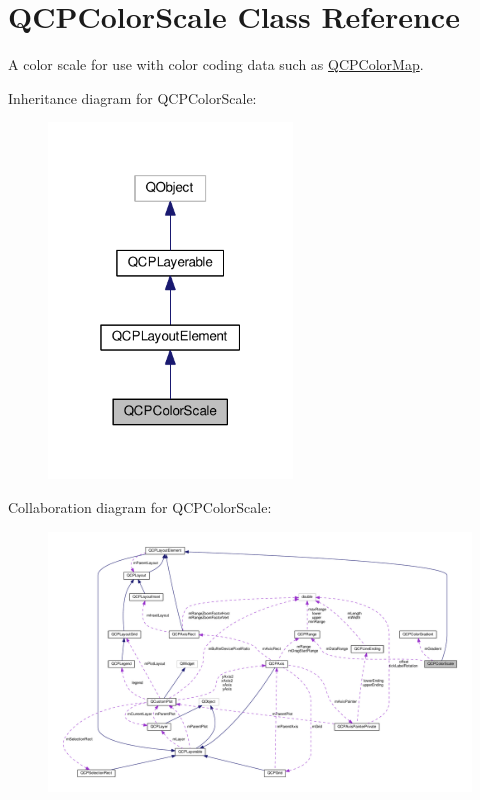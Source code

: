 \hypertarget{classQCPColorScale}{}\section{Q\+C\+P\+Color\+Scale Class Reference}
\label{classQCPColorScale}


A color scale for use with color coding data such as \hyperlink{classQCPColorMap}{Q\+C\+P\+Color\+Map}.  




Inheritance diagram for Q\+C\+P\+Color\+Scale\+:
\nopagebreak
\begin{figure}[H]
\begin{center}
\leavevmode
\includegraphics[width=184pt]{classQCPColorScale__inherit__graph}
\end{center}
\end{figure}


Collaboration diagram for Q\+C\+P\+Color\+Scale\+:
\nopagebreak
\begin{figure}[H]
\begin{center}
\leavevmode
\includegraphics[width=350pt]{classQCPColorScale__coll__graph}
\end{center}
\end{figure}
